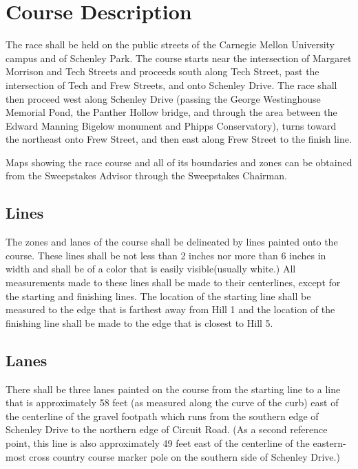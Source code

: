 \chapter{Course Description}

	The race shall be held on the public streets of the Carnegie Mellon University
	campus and of Schenley Park. The course starts near the intersection of
	Margaret Morrison and Tech Streets and proceeds south along Tech Street, past
	the intersection of Tech and Frew Streets, and onto Schenley Drive. The race
	shall then proceed west along Schenley Drive (passing the George Westinghouse
	Memorial Pond, the Panther Hollow bridge, and through the area between the
	Edward Manning Bigelow monument and Phipps Conservatory), turns toward the
	northeast onto Frew Street, and then east along Frew Street to the finish line.

	Maps showing the race course and all of its boundaries and zones can be
	obtained from the Sweepstakes Advisor through the Sweepstakes Chairman.

\section{Lines}

	The zones and lanes of the course shall be delineated by lines painted onto the
	course. These lines shall be not less than 2 inches nor more than 6 inches in
	width and shall be of a color that is easily visible(usually white.) All
	measurements made to these lines shall be made to their centerlines, except for
	the starting and finishing lines. The location of the starting line shall be
	measured to the edge that is farthest away from Hill 1 and the location of the
	finishing line shall be made to the edge that is closest to Hill 5.

\section{Lanes}

	There shall be three lanes painted on the course from the starting line to a
	line that is approximately 58 feet (as measured along the curve of the curb)
	east of the centerline of the gravel footpath which runs from the southern edge
	of Schenley Drive to the northern edge of Circuit Road. (As a second reference
	point, this line is also approximately 49 feet east of the centerline of the
	eastern-most cross country course marker pole on the southern side of Schenley
	Drive.)

